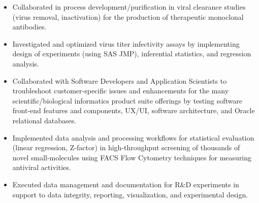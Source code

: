 \documentclass[10pt,a4paper]{altacv}
\begin{document}
\begin{itemize}
    \item   \small{Collaborated in process development/purification in viral clearance studies (virus removal, inactivation) for the production of therapeutic monoclonal antibodies.}
    \item   \small{Investigated and optimized virus titer infectivity assays by implementing design of experiments (using SAS JMP), inferential statistics, and regression analysis.}
\end{itemize}

\medskip



\begin{itemize}
    \item   \small{Collaborated with Software Developers and Application Scientists to troubleshoot customer-specific issues and enhancements for the many scientific/biological informatics product suite offerings by testing software front-end features and components, UX/UI, software architecture, and Oracle relational databases.}
\end{itemize}

\medskip




\begin{itemize}
    \item   \small{Implemented data analysis and processing workflows for statistical evaluation (linear regression, Z-factor) in high-throughput screening of thousands of novel small-molecules using FACS Flow Cytometry techniques for measuring antiviral activities.}
    \item   \small{Executed data management and documentation for R\&D experiments in support to data integrity, reporting, visualization, and experimental design.}
    
\end{itemize}
\end{document}
